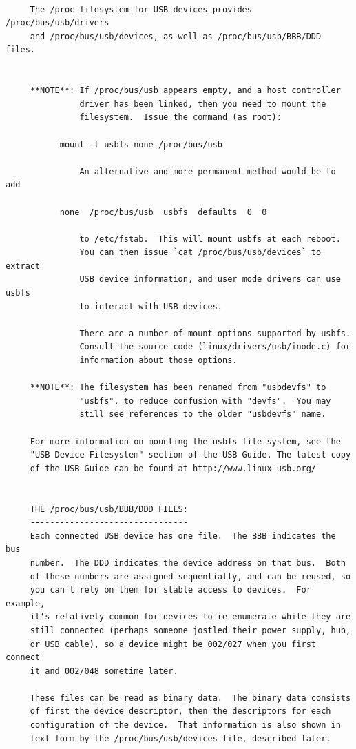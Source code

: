 {{{{{{{{{{{{{{{\begin{verbatim}
     
     The /proc filesystem for USB devices provides /proc/bus/usb/drivers
     and /proc/bus/usb/devices, as well as /proc/bus/usb/BBB/DDD files.
     
     
     **NOTE**: If /proc/bus/usb appears empty, and a host controller
               driver has been linked, then you need to mount the
               filesystem.  Issue the command (as root):
     
           mount -t usbfs none /proc/bus/usb
     
               An alternative and more permanent method would be to add
     
           none  /proc/bus/usb  usbfs  defaults  0  0
     
               to /etc/fstab.  This will mount usbfs at each reboot.
               You can then issue `cat /proc/bus/usb/devices` to extract
               USB device information, and user mode drivers can use usbfs
               to interact with USB devices.
     
               There are a number of mount options supported by usbfs.
               Consult the source code (linux/drivers/usb/inode.c) for
               information about those options.
     
     **NOTE**: The filesystem has been renamed from "usbdevfs" to
               "usbfs", to reduce confusion with "devfs".  You may
               still see references to the older "usbdevfs" name.
     
     For more information on mounting the usbfs file system, see the
     "USB Device Filesystem" section of the USB Guide. The latest copy
     of the USB Guide can be found at http://www.linux-usb.org/
     
     
     THE /proc/bus/usb/BBB/DDD FILES:
     --------------------------------
     Each connected USB device has one file.  The BBB indicates the bus
     number.  The DDD indicates the device address on that bus.  Both
     of these numbers are assigned sequentially, and can be reused, so
     you can't rely on them for stable access to devices.  For example,
     it's relatively common for devices to re-enumerate while they are
     still connected (perhaps someone jostled their power supply, hub,
     or USB cable), so a device might be 002/027 when you first connect
     it and 002/048 sometime later.
     
     These files can be read as binary data.  The binary data consists
     of first the device descriptor, then the descriptors for each
     configuration of the device.  That information is also shown in
     text form by the /proc/bus/usb/devices file, described later.
     

\end{verbatim}}}}}}}}}}}}}}}}
